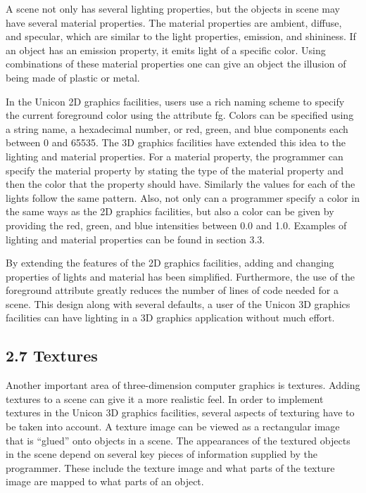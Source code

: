 \documentclass[letterpaper]{article}
\begin{document}
A scene not only has several lighting properties, but the objects in
scene may have several material properties. The material properties
are ambient, diffuse, and specular, which are similar to the light
properties, emission, and shininess. If an object has an emission
property, it emits light of a specific color. Using combinations of
these material properties one can give an object the illusion of being
made of plastic or metal.

In the Unicon 2D graphics facilities, users use a rich naming scheme
to specify the current foreground color using the attribute
\textsf{fg}. Colors can be specified using a string name, a
hexadecimal number, or red, green, and blue components each between
\textsf{0} and \textsf{65535}. The 3D graphics facilities have
extended this idea to the lighting and material properties. For a
material property, the programmer can specify the material property by
stating the type of the material property and then the color that the
property should have. Similarly the values for each of the lights
follow the same pattern. Also, not only can a programmer specify a
color in the same ways as the 2D graphics facilities, but also a color
can be given by providing the red, green, and blue intensities between
\textsf{0.0} and \textsf{1.0}. Examples of lighting and material
properties can be found in section 3.3.

By extending the features of the 2D graphics facilities, adding and
changing properties of lights and material has been simplified.
Furthermore, the use of the foreground attribute greatly reduces
the number of lines of code needed for a scene. This design along
with several defaults, a user of the Unicon 3D graphics facilities
can have lighting in a 3D graphics application without much effort.


\subsection[2.7 Textures]{2.7 Textures}

Another important area of three-dimension computer graphics is
textures. Adding textures to a scene can give it a more realistic
feel. In order to implement textures in the Unicon 3D graphics
facilities, several aspects of texturing have to be taken into
account. A texture image can be viewed as a rectangular image that is
``glued'' onto objects in a scene. The appearances of the textured
objects in the scene depend on several key pieces of information
supplied by the programmer. These include the texture image and what
parts of the texture image are mapped to what parts of an object.
\end{document}
